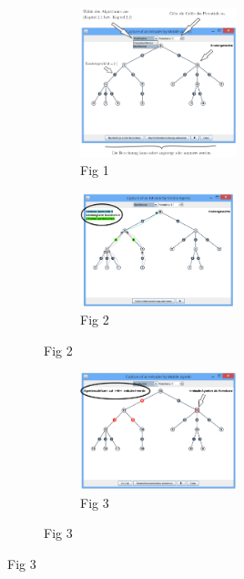 \begin{figure}[h]
		\begin{figure}[H]
			\caption{My Figure}
			\begin{subfigure}{\textwidth}
				\caption{Fig 1}
				\includegraphics[width=0.65\textwidth]{bilder/abb_erklaerung1.png}
			\end{subfigure}
			\begin{subfigure}{\textwidth}
				\caption{Fig 2}
				\includegraphics[width=0.65\textwidth]{bilder/abb_erklaerung2.png}
			\end{subfigure}
		\end{figure}
		\clearpage
		\begin{figure}[H]
			\ContinuedFloat %
			\begin{subfigure}{\textwidth}
				\caption{Fig 3}
				\includegraphics[width=0.65\textwidth]{bilder/abb_erklaerung3.png}

\end{subfigure}
\end{figure}
\end{figure}
